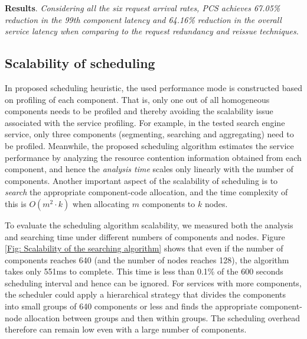 \documentclass[10pt, conference, compsocconf]{IEEEtran}
\begin{document}
\textbf{Results}. \emph{Considering all the six request arrival rates, PCS achieves 67.05\% reduction in the 99th component latency and 64.16\% reduction in the overall service latency when comparing to the request redundancy and reissue techniques.}







































\subsection{Scalability of scheduling} \label{Section: Scalability of scheduling}



In proposed scheduling heuristic, the used performance mode is constructed based on profiling of each component. That is, only one out of all homogeneous components needs to be profiled and thereby avoiding the scalability issue associated with the service profiling. For example, in the tested search engine service, only three components (segmenting, searching and aggregating) need to be profiled. Meanwhile, the proposed scheduling algorithm estimates the service performance by analyzing the resource contention information obtained from each component, and hence the \emph{analysis time} scales only linearly with the number of components. Another important aspect of the scalability of scheduling is to \emph{search} the appropriate component-code allocation, and the time complexity of this is $O(m^2\cdot k)$ when allocating $m$ components to $k$ nodes.

To evaluate the scheduling algorithm scalability, we measured both the analysis and searching time under different numbers of components and nodes. Figure \ref{Fig: Scalability of the searching algorithm} shows that even if the number of components reaches 640 (and the number of nodes reaches 128), the algorithm takes only 551ms to complete. This time is less than 0.1\% of the 600 seconds scheduling interval and hence can be ignored. For services with more components, the scheduler could apply a hierarchical strategy that divides the components into small groups of 640 components or less and finds the appropriate component-node allocation between groups and then within groups. The scheduling overhead therefore can remain low even with a large number of components.
\end{document}
